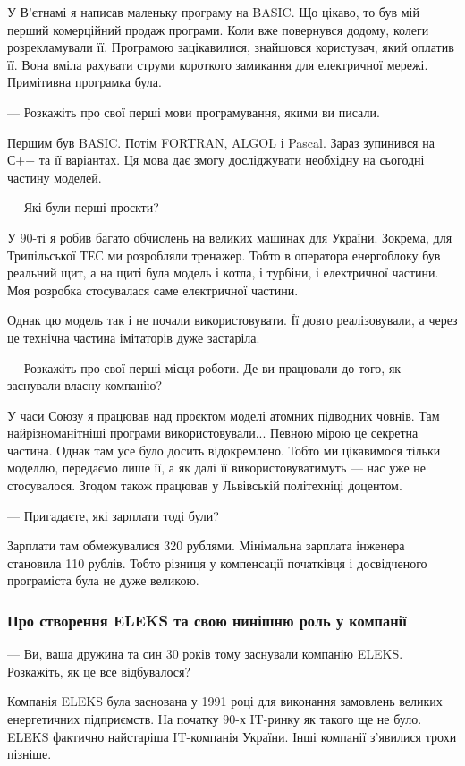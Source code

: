 У В’єтнамі я написав маленьку програму на BASIC. Що цікаво, то був мій перший
комерційний продаж програми. Коли вже повернувся додому, колеги розрекламували
її. Програмою зацікавилися, знайшовся користувач, який оплатив її. Вона вміла
рахувати струми короткого замикання для електричної мережі. Примітивна
програмка була.

— Розкажіть про свої перші мови програмування, якими ви писали.

Першим був BASIC. Потім FORTRAN, ALGOL і Pascal. Зараз зупинився на С++ та її
варіантах. Ця мова дає змогу досліджувати необхідну на сьогодні частину
моделей.

— Які були перші проєкти?

У 90-ті я робив багато обчислень на великих машинах для України. Зокрема, для
Трипільської ТЕС ми розробляли тренажер. Тобто в оператора енергоблоку був
реальний щит, а на щиті була модель і котла, і турбіни, і електричної частини.
Моя розробка стосувалася саме електричної частини.

Однак цю модель так і не почали використовувати. Її довго реалізовували, а
через це технічна частина імітаторів дуже застаріла.

— Розкажіть про свої перші місця роботи. Де ви працювали до того, як заснували
власну компанію?

У часи Союзу я працював над проєктом моделі атомних підводних човнів. Там
найрізноманітніші програми використовували... Певною мірою це секретна частина.
Однак там усе було досить відокремлено. Тобто ми цікавимося тільки моделлю,
передаємо лише її, а як далі її використовуватимуть — нас уже не стосувалося.
Згодом також працював у Львівській політехніці доцентом.

— Пригадаєте, які зарплати тоді були?

Зарплати там обмежувалися 320 рублями. Мінімальна зарплата інженера становила
110 рублів. Тобто різниця у компенсації початківця і досвідченого програміста
була не дуже великою.

\subsubsection{Про створення ELEKS та свою нинішню роль у компанії}

— Ви, ваша дружина та син 30 років тому заснували компанію ELEKS. Розкажіть, як
це все відбувалося?

Компанія ELEKS була заснована у 1991 році для виконання замовлень великих
енергетичних підприємств. На початку 90-х IT-ринку як такого ще не було. ELEKS
фактично найстаріша IT-компанія України. Інші компанії з’явилися трохи пізніше.

